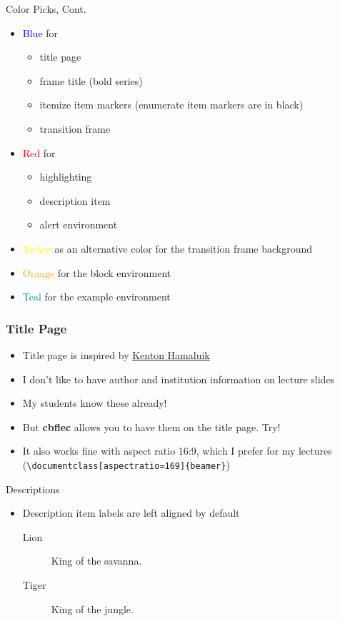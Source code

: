 \documentclass[11pt, aspectratio=43]{beamer}
\begin{document}
\begin{frame}{Color Picks, Cont.}
    \begin{itemize}
        \item \textcolor{blue}{Blue} for
        \begin{itemize}
            \item title page
            \item frame title (bold series)
            \item itemize item markers (enumerate item markers are in black)
            \item transition frame
        \end{itemize}
        \item \textcolor{red}{Red} for
        \begin{itemize}
            \item highlighting 
            \item description item
            \item alert environment
        \end{itemize}
        \item \textcolor{yellow}{Yellow} as an alternative color for the transition frame background 
        \item \textcolor{orange}{Orange} for the block environment
        \item \textcolor{teal}{Teal} for the example environment
    \end{itemize}
\end{frame}

\begin{frame}[fragile]
    \frametitle{Title Page}
    \begin{itemize}
        \item Title page is inspired by \href{https://blog.hamaluik.ca/posts/better-beamer-themes/}{Kenton Hamaluik}
        \item I don't like to have author and institution information on lecture slides
        \item My students know these already!
        \item But \textbf{cbflec} allows you to have them on the title page. Try!
        \item It also works fine with aspect ratio 16:9, which I prefer for my lectures (\verb!\documentclass[aspectratio=169]{beamer}!)
    \end{itemize}
\end{frame}

\begin{frame}{Descriptions}
    \begin{itemize}
        \item Description item labels are left aligned by default
        \begin{description}
            \item[Lion] King of the savanna.
            \item[Tiger] King of the jungle.
        \end{description}
    \end{itemize}
\end{frame}
\end{document}
